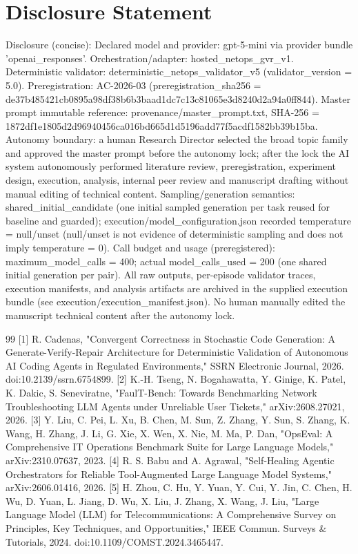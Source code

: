 \documentclass[conference]{IEEEtran}
\begin{document}
\section*{Disclosure Statement}
Disclosure (concise): Declared model and provider: gpt-5-mini via provider bundle 'openai\_responses'. Orchestration/adapter: hosted\_netops\_gvr\_v1. Deterministic validator: deterministic\_netops\_validator\_v5 (validator\_version = 5.0). Preregistration: AC-2026-03 (preregistration\_sha256 = de37b485\allowbreak{}421cb089\allowbreak{}5a98df38\allowbreak{}b6b3baad\allowbreak{}1dc7c13c\allowbreak{}81065e3d\allowbreak{}8240d2a9\allowbreak{}4a0ff844). Master prompt immutable reference: provenance/master\_prompt.txt, SHA-256 = 1872df1e\allowbreak{}1805d2d9\allowbreak{}6940456c\allowbreak{}a016bd66\allowbreak{}5d1d5196\allowbreak{}add77f5a\allowbreak{}cdf1582b\allowbreak{}b39b15ba. Autonomy boundary: a human Research Director selected the broad topic family and approved the master prompt before the autonomy lock; after the lock the AI system autonomously performed literature review, preregistration, experiment design, execution, analysis, internal peer review and manuscript drafting without manual editing of technical content. Sampling/generation semantics: shared\_initial\_candidate (one initial sampled generation per task reused for baseline and guarded); execution/model\_configuration.json recorded temperature = null/unset (null/unset is not evidence of deterministic sampling and does not imply temperature = 0). Call budget and usage (preregistered): maximum\_model\_calls = 400; actual model\_calls\_used = 200 (one shared initial generation per pair). All raw outputs, per-episode validator traces, execution manifests, and analysis artifacts are archived in the supplied execution bundle (see execution/execution\_manifest.json). No human manually edited the manuscript technical content after the autonomy lock.

\begin{thebibliography}{99}
 [1] R. Cadenas, "Convergent Correctness in Stochastic Code Generation: A Generate-Verify-Repair Architecture for Deterministic Validation of Autonomous AI Coding Agents in Regulated Environments," SSRN Electronic Journal, 2026. doi:10.2139/ssrn.6754899.
 [2] K.-H. Tseng, N. Bogahawatta, Y. Ginige, K. Patel, K. Dakic, S. Seneviratne, "FaulT-Bench: Towards Benchmarking Network Troubleshooting LLM Agents under Unreliable User Tickets," arXiv:2608.27021, 2026.
 [3] Y. Liu, C. Pei, L. Xu, B. Chen, M. Sun, Z. Zhang, Y. Sun, S. Zhang, K. Wang, H. Zhang, J. Li, G. Xie, X. Wen, X. Nie, M. Ma, P. Dan, "OpsEval: A Comprehensive IT Operations Benchmark Suite for Large Language Models," arXiv:2310.07637, 2023.
 [4] R. S. Babu and A. Agrawal, "Self-Healing Agentic Orchestrators for Reliable Tool-Augmented Large Language Model Systems," arXiv:2606.01416, 2026.
 [5] H. Zhou, C. Hu, Y. Yuan, Y. Cui, Y. Jin, C. Chen, H. Wu, D. Yuan, L. Jiang, D. Wu, X. Liu, J. Zhang, X. Wang, J. Liu, "Large Language Model (LLM) for Telecommunications: A Comprehensive Survey on Principles, Key Techniques, and Opportunities," IEEE Commun. Surveys \& Tutorials, 2024. doi:10.1109/COMST.2024.3465447.
\end{thebibliography}
\end{document}
